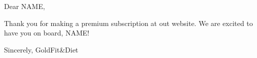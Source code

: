 \documentclass{article}
\begin{document}
Dear NAME,

Thank you for making a premium subscription at out website. We are excited to have you on board, NAME!

Sincerely,
GoldFit&Diet
\end{document}
